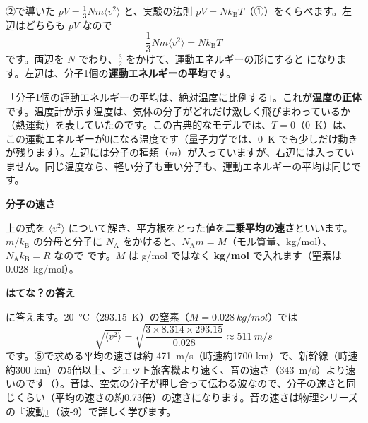 \leavevmode\label{ph:熱-14:sec3}②で導いた $pV=\tfrac13Nm\langle v^2\rangle$ と、実験の法則 $pV=Nk_{\mathrm B}T$（①）をくらべます。左辺はどちらも $pV$ なので
\[ \frac{1}{3}Nm\langle v^2\rangle=Nk_{\mathrm B}T \]
です。両辺を $N$ でわり、$\tfrac32$ をかけて、運動エネルギーの形にすると
\label{ph:熱-14:temp}になります。左辺は、分子1個の\textbf{運動エネルギーの平均}です。

\begin{phyomi}[$\frac{1}{2}m\langle v^2\rangle=\frac{3}{2}k_{\mathrm B}T$]
「分子1個の運動エネルギーの平均は、絶対温度に比例する」。これが\textbf{温度の正体}です。温度計が示す温度は、気体の分子がどれだけ激しく飛びまわっているか（熱運動）を表していたのです。この古典的なモデルでは、$T=0$（\qty{0}{K}）は、この運動エネルギーが0になる温度です（量子力学では、\qty{0}{K} でも少しだけ動きが残ります）。左辺には分子の種類（$m$）が入っていますが、右辺には入っていません。同じ温度なら、軽い分子も重い分子も、運動エネルギーの平均は同じです。
\end{phyomi}

\noindent\textbf{分子の速さ}\par\nobreak
上の式を $\langle v^2\rangle$ について解き、平方根をとった値を\textbf{二乗平均の速さ}といいます。$m/k_{\mathrm B}$ の分母と分子に $N_{\mathrm A}$ をかけると、$N_{\mathrm A}m=M$（モル質量、kg/mol）、$N_{\mathrm A}k_{\mathrm B}=R$ なので
です。$M$ は g/mol ではなく \textbf{kg/mol} で入れます（窒素は \qty{0.028}{kg/mol}）。

\noindent\textbf{はてな？の答え}\par\nobreak
\label{ph:熱-14:hatena}\bkhatenaref に答えます。\qty{20}{\celsius}（\qty{293.15}{K}）の窒素（$M=\qty{0.028}{kg/mol}$）では
\[ \sqrt{\langle v^2\rangle}=\sqrt{\frac{3\times8.314\times293.15}{0.028}}\approx\qty{511}{m/s} \]
です。⑤で求める平均の速さは約 \qty{471}{m/s}（時速約1700 km）で、新幹線（時速約300 km）の5倍以上、ジェット旅客機より速く、音の速さ（\qty{343}{m/s}）より速いのです（\nobreak{}\nobreak）。音は、空気の分子が押し合って伝わる波なので、分子の速さと同じくらい（平均の速さの約0.73倍）の速さになります。音の速さは物理シリーズの『波動』（波-9）で詳しく学びます。

